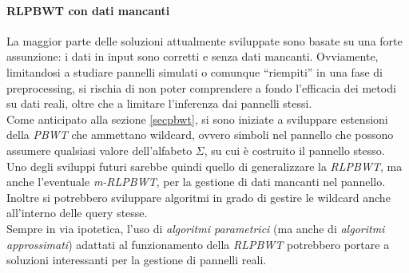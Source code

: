 \paragraph{RLPBWT con dati mancanti}
La maggior parte delle soluzioni attualmente sviluppate sono basate su una forte
assunzione: i dati in input sono corretti e senza dati mancanti. Ovviamente,
limitandosi a studiare pannelli simulati o comunque ``riempiti'' in una fase di
preprocessing, si rischia di non poter comprendere a fondo l'efficacia dei
metodi su dati reali, oltre che a limitare l'inferenza dai pannelli stessi.\\
Come anticipato alla sezione \ref{secpbwt}, si sono iniziate a sviluppare
estensioni della \textit{PBWT} che ammettano wildcard, ovvero simboli nel
pannello che possono assumere qualsiasi valore dell'alfabeto $\Sigma$, su cui è
costruito il pannello stesso.\\
Uno degli sviluppi futuri sarebbe quindi quello di generalizzare la
\textit{RLPBWT}, ma anche l'eventuale \textit{m-RLPBWT}, per la gestione di dati
mancanti nel pannello. Inoltre si potrebbero sviluppare algoritmi in grado di
gestire le wildcard anche all'interno delle query stesse.\\
Sempre in via ipotetica, l'uso di \textit{algoritmi parametrici} (ma anche
di \textit{algoritmi approssimati}) adattati al
funzionamento della \textit{RLPBWT} potrebbero portare a soluzioni interessanti
per la gestione di pannelli reali.
